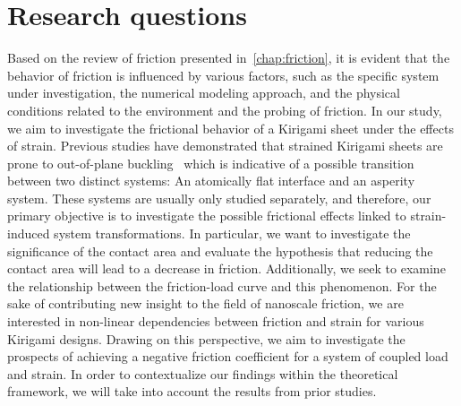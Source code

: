 



\section{Research questions}\label{sec:research_questions}
Based on the review of friction presented in~\cref{chap:friction}, it is evident that the behavior of friction is influenced by various factors, such as the specific system under investigation, the numerical modeling approach, and the physical conditions related to the environment and the probing of friction. In our study, we aim to investigate the frictional behavior
of a Kirigami sheet under the effects of strain. Previous studies have
demonstrated that strained Kirigami sheets are prone to out-of-plane buckling~\cite{PhysRevLett.121.255304, PhysRevResearch.2.042006} which is indicative of a possible transition between two distinct systems: An atomically flat interface and an asperity system. These systems are usually only studied
separately, and therefore, our primary objective is to investigate the possible frictional effects linked to strain-induced system transformations. In particular, we want to investigate the significance of the contact area and evaluate the hypothesis that reducing the contact area will lead to a decrease in friction. Additionally, we seek to examine the relationship between the friction-load curve and this phenomenon. For the sake of contributing new insight to the field of nanoscale
friction, we are interested in non-linear dependencies between
friction and strain for various Kirigami designs. Drawing on this
perspective, we aim to investigate the prospects of achieving a negative friction coefficient for a system of coupled load and strain. In order to contextualize our findings within the theoretical framework, we will take into account the results from prior studies.


